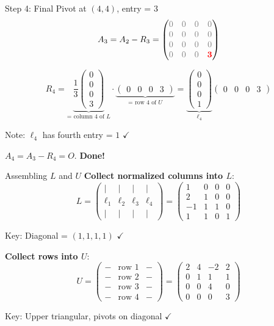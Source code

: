 \documentclass[10pt]{beamer}
\theoremstyle{definition}
\newcommand{\pvt}[1]{{\color{red}\mathbf{#1}}}       %
\newcommand{\rem}[1]{{\color{gray}#1}}                %
\newcommand{\x}[1]{\alert{\textbf{#1}}}
\begin{document}
\begin{frame}{Step 4: Final Pivot at $(4,4)$, entry = $3$}
$$A_3 = A_2 - R_3 = \begin{pmatrix}
\rem{0} & \rem{0} & \rem{0} & \rem{0} \\
\rem{0} & \rem{0} & \rem{0} & \rem{0} \\
\rem{0} & \rem{0} & \rem{0} & \rem{0} \\
\rem{0} & \rem{0} & \rem{0} & \pvt{3}
\end{pmatrix}$$

\vfill
$$R_4 = \underbrace{\frac{1}{3} \begin{pmatrix} 0 \\ 0 \\ 0 \\ 3 \end{pmatrix}}_{\text{= column 4 of } L}
\cdot \underbrace{\begin{pmatrix} 0 & 0 & 0 & 3 \end{pmatrix}}_{\text{= row 4 of } U}
= \underbrace{\begin{pmatrix} 0 \\ 0 \\ 0 \\ 1 \end{pmatrix}}_{\ell_4}
\begin{pmatrix} 0 & 0 & 0 & 3 \end{pmatrix}$$

Note: $\ell_4$ has fourth entry = $1$ $\checkmark$

\vfill
$A_4 = A_3 - R_4 = O$. \quad \x{Done!}
\end{frame}

\begin{frame}{Assembling $L$ and $U$}
\textbf{Collect normalized columns into $L$}:
$$L = \begin{pmatrix}
| & | & | & | \\
\ell_1 & \ell_2 & \ell_3 & \ell_4 \\
| & | & | & |
\end{pmatrix}
= \begin{pmatrix}
1 & 0 & 0 & 0 \\
2 & 1 & 0 & 0 \\
-1 & 1 & 1 & 0 \\
1 & 1 & 0 & 1
\end{pmatrix}$$

Key: Diagonal = $(1, 1, 1, 1)$ $\checkmark$

\vfill
\textbf{Collect rows into $U$}:
$$U = \begin{pmatrix}
- & \text{row 1} & - \\
- & \text{row 2} & - \\
- & \text{row 3} & - \\
- & \text{row 4} & -
\end{pmatrix}
= \begin{pmatrix}
2 & 4 & -2 & 2 \\
0 & 1 & 1 & 1 \\
0 & 0 & 4 & 0 \\
0 & 0 & 0 & 3
\end{pmatrix}$$

Key: Upper triangular, pivots on diagonal $\checkmark$
\end{frame}
\end{document}
